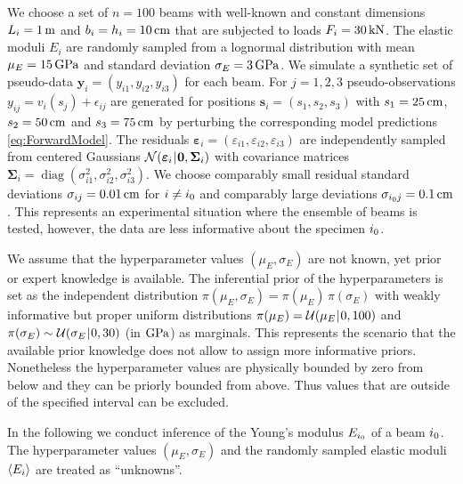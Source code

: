 \par %
We choose a set of \(n=100\) beams with well-known and constant dimensions \(L_i=\unit[1]{m}\) and \(b_i=h_i=\unit[10]{cm}\) that are subjected to loads \(F_i=\unit[30]{kN}\).
The elastic moduli \(E_i\) are randomly sampled from a lognormal distribution with mean \(\mu_E=\unit[15]{GPa}\) and standard deviation \(\sigma_E=\unit[3]{GPa}\).
We simulate a synthetic set of pseudo-data \(\bm{y}_{i}=(y_{i1},y_{i2},y_{i3})\) for each beam.
For \(j=1,2,3\) pseudo-observations \(y_{ij}=v_i(s_j)+\epsilon_{ij}\) are generated for positions \(\bm{s}_i = (s_1,s_2,s_3)\)
with \(s_1=\unit[25]{cm}\), \(s_2=\unit[50]{cm}\) and \(s_3=\unit[75]{cm}\) by perturbing the corresponding model predictions \cref{eq:ForwardModel}.
The residuals \(\bm{\varepsilon}_i = (\varepsilon_{i1},\varepsilon_{i2},\varepsilon_{i3})\) are independently sampled from centered Gaussians
\(\mathcal{N}(\bm{\varepsilon}_i {\:\!}|{\:\!} \bm{0},\bm{\Sigma}_i)\) with covariance matrices \(\bm{\Sigma}_i = \operatorname{diag}(\sigma_{i1}^2,\sigma_{i2}^2,\sigma_{i3}^2)\).
We choose comparably small residual standard deviations \(\sigma_{ij} = \unit[0.01]{cm}\) for \(i \neq i_0\) and comparably large deviations \(\sigma_{\analyzed j} = \unit[0.1]{cm}\).
This represents an experimental situation where the ensemble of beams is tested, however, the data are less informative about the specimen \(i_0\).
\par %
We assume that the hyperparameter values \((\mu_E,\sigma_E)\) are not known, yet prior or expert knowledge is available.
The inferential prior of the hyperparameters is set as the independent distribution \(\pi(\mu_E,\sigma_E) = \pi(\mu_E) \, \pi(\sigma_E)\)
with weakly informative but proper uniform distributions \(\pi(\mu_E)=\mathcal{U}(\mu_E {\:\!}|{\:\!} 0,100)\) and \(\pi(\sigma_E) \sim \mathcal{U}(\sigma_E {\:\!}|{\:\!} 0,30)\) (in \(\unit[]{GPa}\)) as marginals.
This represents the scenario that the available prior knowledge does not allow to assign more informative priors.
Nonetheless the hyperparameter values are physically bounded by zero from below and they can be priorly bounded from above.
Thus values that are outside of the specified interval can be excluded.
\par %
In the following we conduct inference of the Young's modulus \(E_{i_0}\) of a beam \(i_0\).
The hyperparameter values \((\mu_E,\sigma_E)\) and the randomly sampled elastic moduli \(\langle{E_i}\rangle\) are treated as ``unknowns''.
